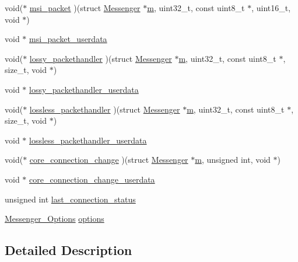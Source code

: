 \begin{DoxyCompactItemize}
\item 
void($\ast$ \hyperlink{struct_messenger_a94a1e6432d69be20e4da5e919f4c61e5}{msi\+\_\+packet} )(struct \hyperlink{struct_messenger}{Messenger} $\ast$\hyperlink{_messenger__test_8c_aea6eb6c7c30a659f1b0dee83eaf03ea2}{m}, uint32\+\_\+t, const uint8\+\_\+t $\ast$, uint16\+\_\+t, void $\ast$)
\item 
void $\ast$ \hyperlink{struct_messenger_a1b0f16a3c32591e1bc33406459dfac29}{msi\+\_\+packet\+\_\+userdata}
\item 
void($\ast$ \hyperlink{struct_messenger_afba23a025d7275ca11e8f7d56386d3d1}{lossy\+\_\+packethandler} )(struct \hyperlink{struct_messenger}{Messenger} $\ast$\hyperlink{_messenger__test_8c_aea6eb6c7c30a659f1b0dee83eaf03ea2}{m}, uint32\+\_\+t, const uint8\+\_\+t $\ast$, size\+\_\+t, void $\ast$)
\item 
void $\ast$ \hyperlink{struct_messenger_a2b87de1f33a502c6dd105cd69a905c35}{lossy\+\_\+packethandler\+\_\+userdata}
\item 
void($\ast$ \hyperlink{struct_messenger_ade523661676bfd811bd8676c29600900}{lossless\+\_\+packethandler} )(struct \hyperlink{struct_messenger}{Messenger} $\ast$\hyperlink{_messenger__test_8c_aea6eb6c7c30a659f1b0dee83eaf03ea2}{m}, uint32\+\_\+t, const uint8\+\_\+t $\ast$, size\+\_\+t, void $\ast$)
\item 
void $\ast$ \hyperlink{struct_messenger_aa46ae2a29721e8b27e0d4aac8b64b195}{lossless\+\_\+packethandler\+\_\+userdata}
\item 
void($\ast$ \hyperlink{struct_messenger_a04d6d710a221e33282b2305ec4158ac4}{core\+\_\+connection\+\_\+change} )(struct \hyperlink{struct_messenger}{Messenger} $\ast$\hyperlink{_messenger__test_8c_aea6eb6c7c30a659f1b0dee83eaf03ea2}{m}, unsigned int, void $\ast$)
\item 
void $\ast$ \hyperlink{struct_messenger_a55d1d5f05bdf28588035d0bffd52ac3a}{core\+\_\+connection\+\_\+change\+\_\+userdata}
\item 
unsigned int \hyperlink{struct_messenger_a97e16f5111643baf9c4f055af6b90e8c}{last\+\_\+connection\+\_\+status}
\item 
\hyperlink{struct_messenger___options}{Messenger\+\_\+\+Options} \hyperlink{struct_messenger_a180dba994d1fff627e19da4179148669}{options}
\end{DoxyCompactItemize}


\subsection{Detailed Description}


